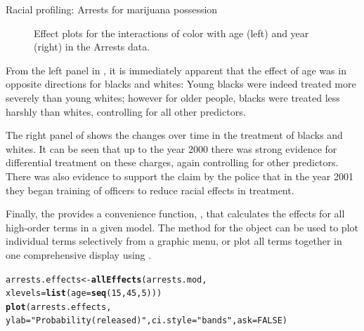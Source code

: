 \documentclass[11pt]{book}\usepackage[]{graphicx}\usepackage[]{color}
\makeatletter
\newcommand{\hlnum}[1]{\textcolor[rgb]{0.686,0.059,0.569}{#1}}%
\newcommand{\hlstr}[1]{\textcolor[rgb]{0.192,0.494,0.8}{#1}}%
\newcommand{\hlstd}[1]{\textcolor[rgb]{0.345,0.345,0.345}{#1}}%
\newcommand{\hlkwb}[1]{\textcolor[rgb]{0.69,0.353,0.396}{#1}}%
\newcommand{\hlkwc}[1]{\textcolor[rgb]{0.333,0.667,0.333}{#1}}%
\newcommand{\hlkwd}[1]{\textcolor[rgb]{0.737,0.353,0.396}{\textbf{#1}}}%
\newenvironment{kframe}{%
 \def\at@end@of@kframe{}%
 \ifinner\ifhmode%
  \def\at@end@of@kframe{\end{minipage}}%
  \begin{minipage}{\columnwidth}%
 \fi\fi%
 \def\FrameCommand##1{\hskip\@totalleftmargin \hskip-\fboxsep
 \colorbox{shadecolor}{##1}\hskip-\fboxsep
     \hskip-\linewidth \hskip-\@totalleftmargin \hskip\columnwidth}%
 \MakeFramed {\advance\hsize-\width
   \@totalleftmargin\z@ \linewidth\hsize
   \@setminipage}}%
 {\par\unskip\endMakeFramed%
 \at@end@of@kframe}
\newenvironment{knitrout}{}{} %
\renewenvironment{knitrout}{\small\renewcommand{\baselinestretch}{.85}}{} %
\makeatother
\begin{document}
\begin{Example}[arrests]{Racial profiling: Arrests for marijuana possession}
\begin{knitrout}
\begin{figure}[!htbp]
\caption[Effect plots for the interactions of color with age (left) and year (right) in the Arrests data]{Effect plots for the interactions of color with age (left) and year (right) in the Arrests data.\label{fig:arrests-eff2}}
\end{figure}


\end{knitrout}
From the left panel in , it is immediately apparent that
the effect of age was in opposite directions for blacks and whites:
Young blacks were indeed treated more severely than young whites; however
for older people, blacks were treated less harshly than whites,
controlling for all other predictors.

The right panel of  shows the changes over time in
the treatment of blacks and whites.  It can be seen that up to the year 2000
there was strong evidence for differential treatment on these charges,
again controlling for other predictors.  There was also evidence to support
the claim by the police that in the year 2001 they began training of officers
to reduce racial effects in treatment.

Finally, the  provides a convenience function, , that
calculates the effects for all high-order terms in a given model. The  method
for the  object can be used to plot individual terms selectively from
a graphic menu, or plot all terms together in one comprehensive display using
.

\begin{knitrout}
\color{fgcolor}\begin{kframe}
\begin{alltt}
\hlstd{arrests.effects} \hlkwb{<-} \hlkwd{allEffects}\hlstd{(arrests.mod,}
                              \hlkwc{xlevels}\hlstd{=}\hlkwd{list}\hlstd{(}\hlkwc{age}\hlstd{=}\hlkwd{seq}\hlstd{(}\hlnum{15}\hlstd{,}\hlnum{45}\hlstd{,}\hlnum{5}\hlstd{)))}
\hlkwd{plot}\hlstd{(arrests.effects,}
     \hlkwc{ylab}\hlstd{=}\hlstr{"Probability(released)"}\hlstd{,} \hlkwc{ci.style}\hlstd{=}\hlstr{"bands"}\hlstd{,} \hlkwc{ask}\hlstd{=}\hlnum{FALSE}\hlstd{)}
\end{alltt}
\end{kframe}\begin{figure}[!htbp]



\end{figure}
\end{knitrout}
\end{Example}
\end{document}
